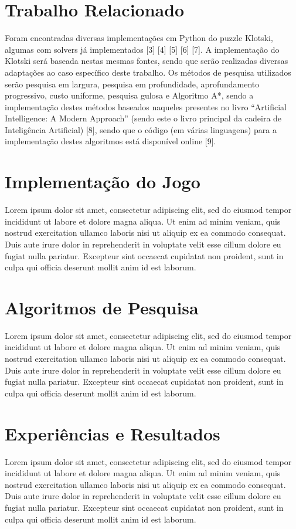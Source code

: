 \documentclass[conference]{IEEEtran}
\begin{document}
\section{Trabalho Relacionado}
Foram encontradas diversas implementações em Python do puzzle Klotski, algumas com solvers já implementados [3] [4] [5] [6] [7]. A implementação do Klotski será baseada nestas mesmas fontes, sendo que serão realizadas diversas adaptações ao caso específico deste trabalho.
Os métodos de pesquisa utilizados serão pesquisa em largura, pesquisa em profundidade, aprofundamento progressivo, custo uniforme, pesquisa gulosa e Algoritmo A*, sendo a implementação destes métodos baseados naqueles presentes no livro “Artificial Intelligence: A Modern Approach” (sendo este o livro principal da cadeira de Inteligência Artificial) [8], sendo que o código (em várias linguagens) para a implementação destes algoritmos está disponível online [9].

\section{Implementação do Jogo}
Lorem ipsum dolor sit amet, consectetur adipiscing elit, sed do eiusmod tempor incididunt ut labore et dolore magna aliqua. Ut enim ad minim veniam, quis nostrud exercitation ullamco laboris nisi ut aliquip ex ea commodo consequat. Duis aute irure dolor in reprehenderit in voluptate velit esse cillum dolore eu fugiat nulla pariatur. Excepteur sint occaecat cupidatat non proident, sunt in culpa qui officia deserunt mollit anim id est laborum.

\section{Algoritmos de Pesquisa}

Lorem ipsum dolor sit amet, consectetur adipiscing elit, sed do eiusmod tempor incididunt ut labore et dolore magna aliqua. Ut enim ad minim veniam, quis nostrud exercitation ullamco laboris nisi ut aliquip ex ea commodo consequat. Duis aute irure dolor in reprehenderit in voluptate velit esse cillum dolore eu fugiat nulla pariatur. Excepteur sint occaecat cupidatat non proident, sunt in culpa qui officia deserunt mollit anim id est laborum.
\section{Experiências e Resultados}
Lorem ipsum dolor sit amet, consectetur adipiscing elit, sed do eiusmod tempor incididunt ut labore et dolore magna aliqua. Ut enim ad minim veniam, quis nostrud exercitation ullamco laboris nisi ut aliquip ex ea commodo consequat. Duis aute irure dolor in reprehenderit in voluptate velit esse cillum dolore eu fugiat nulla pariatur. Excepteur sint occaecat cupidatat non proident, sunt in culpa qui officia deserunt mollit anim id est laborum.
\end{document}
